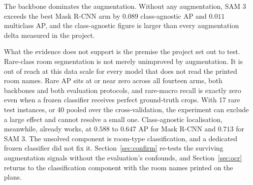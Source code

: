 The backbone dominates the augmentation. Without any augmentation, SAM 3 exceeds
the best Mask R-CNN arm by $0.089$ class-agnostic AP and $0.011$ multiclass AP,
and the class-agnostic figure is larger than every augmentation delta measured
in the project.

What the evidence does not support is the premise the project set out to test.
Rare-class room segmentation is not merely unimproved by augmentation. It is out
of reach at this data scale for every model that does not read the printed room names. Rare AP sits at or near zero
across all fourteen arms, both backbones and both evaluation protocols, and
rare-macro recall is exactly zero even when a frozen classifier receives perfect
ground-truth crops. With 17 rare test instances, or 40 pooled over the
cross-validation, the experiment can exclude a large effect and cannot resolve a
small one. Class-agnostic localisation, meanwhile, already works, at $0.588$ to
$0.647$ AP for Mask R-CNN and $0.713$ for SAM 3. The unsolved component is
room-type classification, and a dedicated frozen classifier did not fix it.
Section~\ref{sec:confirm} re-tests the surviving augmentation signals without
the evaluation's confounds, and Section~\ref{sec:ocr} returns to the
classification component with the room names printed on the plans.
